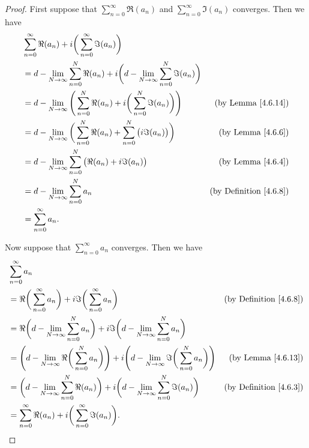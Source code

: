\begin{proof}
    First suppose that \(\sum_{n = 0}^\infty \Re(a_n)\) and \(\sum_{n = 0}^\infty \Im(a_n)\) converges.
    Then we have
    \begin{align*}
         & \sum_{n = 0}^\infty \Re(a_n) + i \bigg(\sum_{n = 0}^\infty \Im(a_n)\bigg)                                                                              \\
         & = d - \lim_{N \to \infty} \sum_{n = 0}^N \Re(a_n) + i \bigg(d - \lim_{N \to \infty} \sum_{n = 0}^N \Im(a_n)\bigg)                                      \\
         & = d - \lim_{N \to \infty} \Bigg(\sum_{n = 0}^N \Re(a_n) + i \bigg(\sum_{n = 0}^N \Im(a_n)\bigg)\Bigg)             & \text{(by Lemma \ref{4.6.14})}     \\
         & = d - \lim_{N \to \infty} \bigg(\sum_{n = 0}^N \Re(a_n) + \sum_{n = 0}^N \big(i \Im(a_n)\big)\bigg)               & \text{(by Lemma \ref{4.6.6})}      \\
         & = d - \lim_{N \to \infty} \sum_{n = 0}^N \big(\Re(a_n) + i \Im(a_n)\big)                                          & \text{(by Lemma \ref{4.6.4})}      \\
         & = d - \lim_{N \to \infty} \sum_{n = 0}^N a_n                                                                      & \text{(by Definition \ref{4.6.8})} \\
         & = \sum_{n = 0}^\infty a_n.
    \end{align*}

    Now suppose that \(\sum_{n = 0}^\infty a_n\) converges.
    Then we have
    \begin{align*}
         & \sum_{n = 0}^\infty a_n                                                                                                                                                                \\
         & = \Re\bigg(\sum_{n = 0}^\infty a_n\bigg) + i \Im\bigg(\sum_{n = 0}^\infty a_n\bigg)                                                               & \text{(by Definition \ref{4.6.8})} \\
         & = \Re\bigg(d - \lim_{N \to \infty} \sum_{n = 0}^N a_n\bigg) + i \Im\bigg(d - \lim_{N \to \infty} \sum_{n = 0}^N a_n\bigg)                                                              \\
         & = \Bigg(d - \lim_{N \to \infty} \Re\bigg(\sum_{n = 0}^N a_n\bigg)\Bigg) + i \Bigg(d - \lim_{N \to \infty} \Im\bigg(\sum_{n = 0}^N a_n\bigg)\Bigg) & \text{(by Lemma \ref{4.6.13})}     \\
         & = \bigg(d - \lim_{N \to \infty} \sum_{n = 0}^N \Re(a_n)\bigg) + i \bigg(d - \lim_{N \to \infty} \sum_{n = 0}^N \Im(a_n)\bigg)                     & \text{(by Definition \ref{4.6.3})} \\
         & = \sum_{n = 0}^\infty \Re(a_n) + i \bigg(\sum_{n = 0}^\infty \Im(a_n)\bigg).
    \end{align*}
\end{proof}

